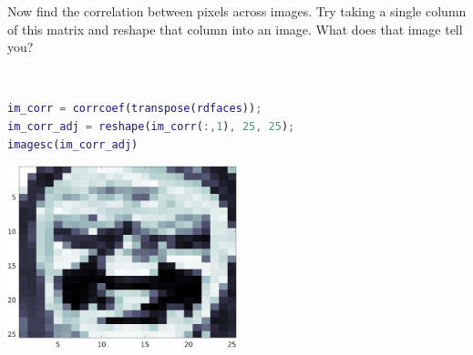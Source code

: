Now find the correlation between pixels across images. Try taking a single column of this matrix and reshape that column into an image. What does that image tell you?

\begin{solution} \
    \begin{lstlisting}[language=Matlab]
im_corr = corrcoef(transpose(rdfaces));
im_corr_adj = reshape(im_corr(:,1), 25, 25);
imagesc(im_corr_adj)
    \end{lstlisting}
    
    \begin{center}
        \includegraphics[width=0.5\textwidth]{img/e6p2.png}
    \end{center}
\end{solution}
